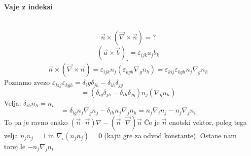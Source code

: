 \documentclass[a4paper]{article}
\newcommand{\vct}[1]{\overrightarrow{#1}}
\begin{document}
\paragraph{Vaje z indeksi}\text{} \\
$$\vct{n} \times (\vct{\nabla} \times \vct{n}) = ?$$
$$(\vct{a} \times \vct{b})_i = \varepsilon_{ijk} a_jb_k$$
$$\vct{n} \times (\vct{\nabla} \times \vct{n}) = \varepsilon_{ijk} n_j (\varepsilon_{kgh} \nabla_g n_h) = \varepsilon_{kij}\varepsilon_{kgh} n_j\nabla_gn_h$$
Poznamo zvezo $\varepsilon_{kij}\varepsilon_{kgh} = \delta_ig\delta_{jh} - \delta_{ih}\delta_{jg}$
$$=(\delta_{ig}\delta_{jh} - \delta_{ih}\delta_{jg})n_j(\nabla_gn_h)$$
Velja: $\delta_{ih}n_h = n_i$
$$= \delta_{ig} n_j\nabla_gn_j - \delta_{ih} n_j\nabla_jn_h = n_j\nabla_in_j - n_j\nabla_jn_i$$
To pa je ravno enako $(\vct{n}\cdot\vct{n})\nabla-(\vct{n}\cdot\vct{\nabla})\vct{n}$
Če je $\vct{n}$ enotski vektor, poleg tega velja $n_jn_j = 1$ in $\nabla_i(n_jn_j) = 0$ (kajti gre za odvod konstante). Ostane nam torej le $-n_j\nabla_jn_i$
\end{document}
